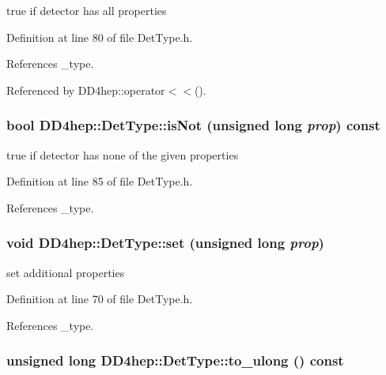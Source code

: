 true if detector has all properties 

Definition at line 80 of file DetType.h.

References \_\-type.

Referenced by DD4hep::operator$<$$<$().\hypertarget{class_d_d4hep_1_1_det_type_a63b12afcb031ac39996c6dbd7481ff11}{
\subsubsection[{isNot}]{\setlength{\rightskip}{0pt plus 5cm}bool DD4hep::DetType::isNot (unsigned long {\em prop}) const}}
\label{class_d_d4hep_1_1_det_type_a63b12afcb031ac39996c6dbd7481ff11}


true if detector has none of the given properties 

Definition at line 85 of file DetType.h.

References \_\-type.\hypertarget{class_d_d4hep_1_1_det_type_ada4a0d1afa3bfa7e8d135b52af921dd3}{
\subsubsection[{set}]{\setlength{\rightskip}{0pt plus 5cm}void DD4hep::DetType::set (unsigned long {\em prop})}}
\label{class_d_d4hep_1_1_det_type_ada4a0d1afa3bfa7e8d135b52af921dd3}


set additional properties 

Definition at line 70 of file DetType.h.

References \_\-type.\hypertarget{class_d_d4hep_1_1_det_type_afbd853fb8619a470e3d649e20630eca4}{
\subsubsection[{to\_\-ulong}]{\setlength{\rightskip}{0pt plus 5cm}unsigned long DD4hep::DetType::to\_\-ulong () const}}
\label{class_d_d4hep_1_1_det_type_afbd853fb8619a470e3d649e20630eca4}


